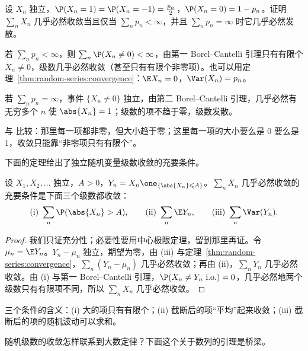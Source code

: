\begin{workedexample}\label{we:random-series:sparse-signs}
设 $X_n$ 独立，$\P(X_n=1)=\P(X_n=-1)=\frac{p_n}2$，$\P(X_n=0)=1-p_n$。证明 $\sum_nX_n$ 几乎必然收敛当且仅当 $\sum_np_n<\infty$，并且 $\sum_np_n=\infty$ 时它几乎必然发散。
\end{workedexample}
\begin{solution}
若 $\sum_np_n<\infty$，则 $\sum_n\P(X_n\neq0)<\infty$，由第一 Borel--Cantelli 引理只有有限个 $X_n\neq0$，级数几乎必然收敛（甚至只有有限个非零项）。也可以用定理~\ref{thm:random-series:convergence}：$\E X_n=0$，$\Var(X_n)=p_n$。

若 $\sum_np_n=\infty$，事件 $\{X_n\neq0\}$ 独立，由第二 Borel--Cantelli 引理，几乎必然有无穷多个 $n$ 使 $\abs{X_n}=1$；级数的项不趋于零，级数发散。

与 比较：那里每一项都非零，但大小趋于零；这里每一项的大小要么是 $0$ 要么是 $1$，收敛只能靠“非零项只有有限个”。
\end{solution}

下面的定理给出了独立随机变量级数收敛的充要条件。

\begin{theorem}\label{thm:random-series:three-series}
设 $X_1,X_2,\dots$ 独立，$A>0$，$Y_n=X_n\one_{\{\abs{X_n}\leqslant A\}}$。$\sum_nX_n$ 几乎必然收敛的充要条件是下面三个级数都收敛：
\[
\text{(i)}\ \sum_n\P(\abs{X_n}>A),\qquad\text{(ii)}\ \sum_n\E Y_n,\qquad\text{(iii)}\ \sum_n\Var(Y_n).
\]
\end{theorem}
\begin{proof}
我们只证充分性；必要性要用中心极限定理，留到那里再证。令 $\mu_n=\E Y_n$。$Y_n-\mu_n$ 独立，期望为零，由 (iii) 与定理~\ref{thm:random-series:convergence}，$\sum_n(Y_n-\mu_n)$ 几乎必然收敛；再由 (ii)，$\sum_nY_n$ 几乎必然收敛。由 (i) 与第一 Borel--Cantelli 引理，$\P(X_n\neq Y_n\ \text{i.o.})=0$，几乎必然地两个级数只有有限项不同，所以 $\sum_nX_n$ 几乎必然收敛。
\end{proof}

三个条件的含义：(i) 大的项只有有限个；(ii) 截断后的项“平均”起来收敛；(iii) 截断后的项的随机波动可以求和。


随机级数的收敛怎样联系到大数定律？下面这个关于数列的引理是桥梁。

